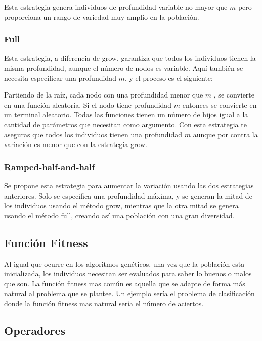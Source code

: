 \documentclass[12pt]{article} \usepackage[utf8x]{inputenc}
\begin{document}
Esta estrategia genera individuos de profundidad variable no mayor que
\(m\) pero proporciona un rango de variedad muy amplio en la población.

\subsubsection{Full}

Esta estrategia, a diferencia de grow, garantiza que todos los
individuos tienen la misma profundidad, aunque el número de nodos es
variable. Aquí también se necesita especificar una profundidad \(m\),
y el proceso es el siguiente:

Partiendo de la raíz, cada nodo con una profundidad menor que \(m\)
, se convierte en una función aleatoria. Si el nodo tiene profundidad
\(m\) entonces se convierte en un terminal aleatorio. Todas las funciones 
tienen un número de hijos igual a la cantidad de parámetros que necesitan 
como argumento. Con esta estrategia te aseguras que todos los individuos 
tienen una profundidad \(m\) aunque por contra la variación es menor 
que con la estrategia grow.\\

\subsubsection{Ramped-half-and-half}

Se propone esta estrategia para aumentar la variación usando las dos
estrategias anteriores. Solo se especifica una profundidad máxima, y
se generan la mitad de los individuos usando el método grow, mientras
que la otra mitad se genera usando el método full, creando así una
población con una gran diversidad.

\subsection{Función Fitness}

Al igual que ocurre en los algoritmos genéticos, una vez que la
población esta inicializada, los individuos necesitan ser evaluados
para saber lo buenos o malos que son. La función fitness mas
común es aquella que se adapte de forma más natural al problema que se
plantee. Un ejemplo sería el problema de clasificación donde la
función fitness mas natural sería el número de aciertos.

\subsection{Operadores}
\end{document}
